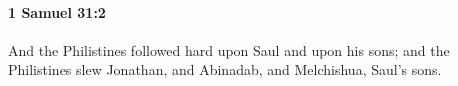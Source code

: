 
		\paragraph{1 Samuel 31:2} %
			\label{1SAMUEL-31-2}

			And the Philistines followed hard upon Saul and upon his sons; and the Philistines slew Jonathan, and Abinadab, and Melchishua, Saul’s sons.


